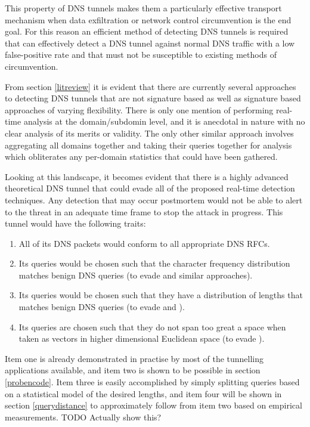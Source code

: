 \documentclass[12pt]{report}
\theoremstyle{remark}
\theoremstyle{definition}
\theoremstyle{definition}
\theoremstyle{definition}
\begin{document}
This property of DNS tunnels makes them a particularly effective transport
mechanism
when data exfiltration or network control circumvention is the end goal. For
this reason an efficient method of detecting DNS tunnels is required that can
effectively detect a DNS tunnel against normal DNS traffic with a low
false-positive rate and that must not be susceptible to existing methods of
circumvention.

From section \ref{litreview} it is evident that there are currently several
approaches to detecting DNS tunnels that are not signature based as well as
signature based approaches of varying flexibility. There is only one mention of
performing real-time analysis at the domain/subdomin level, and it is anecdotal in nature
with no clear analysis of its merits or validity. The only other similar
approach involves aggregating all domains together and taking their queries
together for analysis which obliterates any per-domain statistics that could have been gathered.

Looking at this landscape, it becomes evident that there is a highly advanced theoretical
DNS tunnel that could evade all of the proposed real-time detection techniques.
Any detection that may occur postmortem would not be
able to alert to the threat in an adequate time frame to stop the attack in
progress. This tunnel would have the following traits:

\label{supertunnel}
\begin{enumerate}
\item All of its DNS packets would conform to all appropriate DNS RFCs.
\item Its queries would be chosen such that the character frequency distribution
matches benign DNS queries (to evade \cite{Born2010.cfa} and similar approaches).
\item Its queries would be chosen such that they have a distribution of lengths that
matches benign DNS queries (to evade \cite{Karasaridis2006} and \cite{SANS2013}).
\item Its queries are chosen such that they do not span too great a space when taken as vectors in higher dimensional Euclidean space (to evade \cite{jhind2009}).
\end{enumerate}

Item one is already demonstrated in practise by most of the tunnelling
applications available, and item two is shown to be possible in section
\ref{probencode}. Item three is easily accomplished by simply splitting queries based on a statistical model of the desired lengths, and item four will be shown in section \ref{querydistance} to approximately follow from item two based on empirical measurements. TODO Actually show this?
\end{document}
